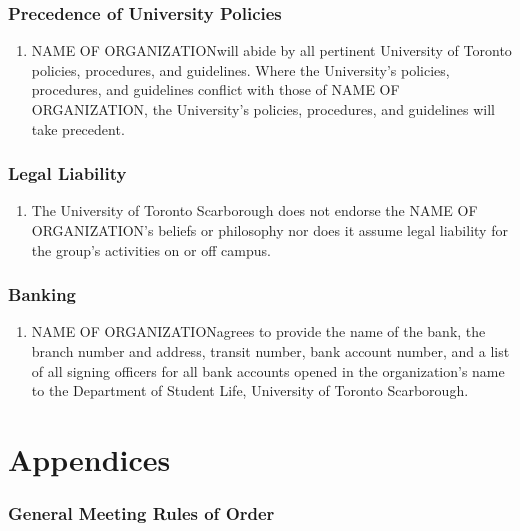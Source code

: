 \documentclass[12pt]{article}
\newcommand{\orgname}{NAME OF ORGANIZATION\space}
\begin{document}
\section{Precedence of University Policies}
\begin{enumerate}[{15}.1]
    \item \orgname will abide by all pertinent University of Toronto policies, procedures, and guidelines. Where the University’s policies, procedures, and guidelines conflict with those of \orgname, the University’s policies, procedures, and guidelines will take precedent.
\end{enumerate}


\section{Legal Liability}
\begin{enumerate}[{16}.1]
    \item The University of Toronto Scarborough does not endorse the \orgname’s beliefs or philosophy nor does it assume legal liability for the group’s activities on or off campus.\end{enumerate}


\section{Banking}
\begin{enumerate}[{17}.1]
    \item \orgname agrees to provide the name of the bank, the branch number and address, transit number, bank account number, and a list of all signing officers for all bank accounts opened in the organization’s name to the Department of Student Life, University of Toronto Scarborough.
\end{enumerate}



\pagebreak[4]
\appendix
\part{Appendices}

\section{General Meeting Rules of Order}


\end{document}
